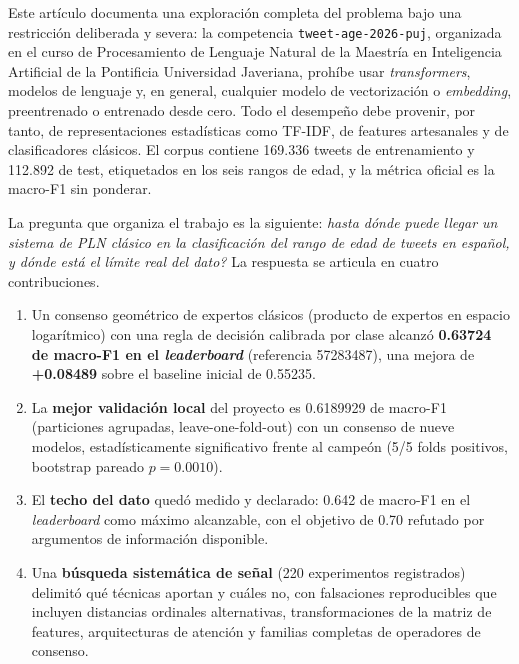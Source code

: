 \documentclass[journal]{IEEEtai}
\begin{document}
Este art\'iculo documenta una exploraci\'on completa del problema bajo una restricci\'on deliberada y severa: la competencia \texttt{tweet-age-2026-puj}, organizada en el curso de Procesamiento de Lenguaje Natural de la Maestr\'ia en Inteligencia Artificial de la Pontificia Universidad Javeriana, proh\'ibe usar \textit{transformers}, modelos de lenguaje y, en general, cualquier modelo de vectorizaci\'on o \textit{embedding}, preentrenado o entrenado desde cero. Todo el desempe\~no debe provenir, por tanto, de representaciones estad\'isticas como TF-IDF, de features artesanales y de clasificadores cl\'asicos. El corpus contiene 169.336 tweets de entrenamiento y 112.892 de test, etiquetados en los seis rangos de edad, y la m\'etrica oficial es la macro-F1 sin ponderar.

La pregunta que organiza el trabajo es la siguiente: \emph{\textquestiondown hasta d\'onde puede llegar un sistema de PLN cl\'asico en la clasificaci\'on del rango de edad de tweets en espa\~nol, y d\'onde est\'a el l\'imite real del dato?} La respuesta se articula en cuatro contribuciones.

\begin{enumerate}
\item Un consenso geom\'etrico de expertos cl\'asicos (producto de expertos en espacio logar\'itmico) con una regla de decisi\'on calibrada por clase alcanz\'o \textbf{0.63724 de macro-F1 en el \textit{leaderboard}} (referencia 57283487), una mejora de \textbf{+0.08489} sobre el baseline inicial de 0.55235.
\item La \textbf{mejor validaci\'on local} del proyecto es 0.6189929 de macro-F1 (particiones agrupadas, leave-one-fold-out) con un consenso de nueve modelos, estad\'isticamente significativo frente al campe\'on (5/5 folds positivos, bootstrap pareado $p = 0.0010$).
\item El \textbf{techo del dato} qued\'o medido y declarado: 0.642 de macro-F1 en el \textit{leaderboard} como m\'aximo alcanzable, con el objetivo de 0.70 refutado por argumentos de informaci\'on disponible.
\item Una \textbf{b\'usqueda sistem\'atica de se\~nal} (220 experimentos registrados) delimit\'o qu\'e t\'ecnicas aportan y cu\'ales no, con falsaciones reproducibles que incluyen distancias ordinales alternativas, transformaciones de la matriz de features, arquitecturas de atenci\'on y familias completas de operadores de consenso.
\end{enumerate}
\end{document}
